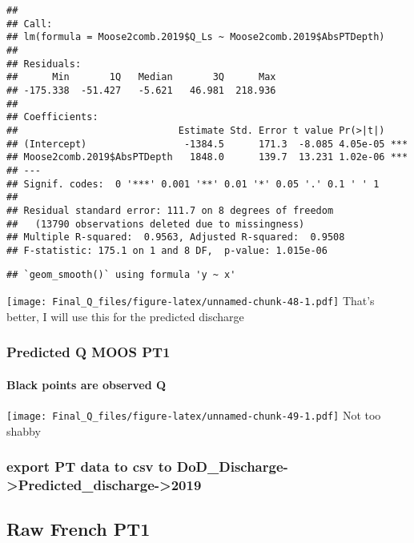 \documentclass[
]{article}
\begin{document}
\begin{verbatim}
## 
## Call:
## lm(formula = Moose2comb.2019$Q_Ls ~ Moose2comb.2019$AbsPTDepth)
## 
## Residuals:
##      Min       1Q   Median       3Q      Max 
## -175.338  -51.427   -5.621   46.981  218.936 
## 
## Coefficients:
##                            Estimate Std. Error t value Pr(>|t|)    
## (Intercept)                 -1384.5      171.3  -8.085 4.05e-05 ***
## Moose2comb.2019$AbsPTDepth   1848.0      139.7  13.231 1.02e-06 ***
## ---
## Signif. codes:  0 '***' 0.001 '**' 0.01 '*' 0.05 '.' 0.1 ' ' 1
## 
## Residual standard error: 111.7 on 8 degrees of freedom
##   (13790 observations deleted due to missingness)
## Multiple R-squared:  0.9563, Adjusted R-squared:  0.9508 
## F-statistic: 175.1 on 1 and 8 DF,  p-value: 1.015e-06
\end{verbatim}

\begin{verbatim}
## `geom_smooth()` using formula 'y ~ x'
\end{verbatim}

\texttt{[image: Final\_Q\_files/figure-latex/unnamed-chunk-48-1.pdf]}
That's better, I will use this for the predicted discharge

\hypertarget{predicted-q-moos-pt1}{%
\subsubsection{Predicted Q MOOS PT1}\label{predicted-q-moos-pt1}}

\hypertarget{black-points-are-observed-q-4}{%
\paragraph{Black points are observed
Q}\label{black-points-are-observed-q-4}}

\texttt{[image: Final\_Q\_files/figure-latex/unnamed-chunk-49-1.pdf]} Not
too shabby

\hypertarget{export-pt-data-to-csv-to-dod_discharge-predicted_discharge-2019}{%
\subsubsection{export PT data to csv to
DoD\_Discharge-\textgreater Predicted\_discharge-\textgreater2019}\label{export-pt-data-to-csv-to-dod_discharge-predicted_discharge-2019}}

\hypertarget{raw-french-pt1}{%
\subsection{Raw French PT1}\label{raw-french-pt1}}
\end{document}
